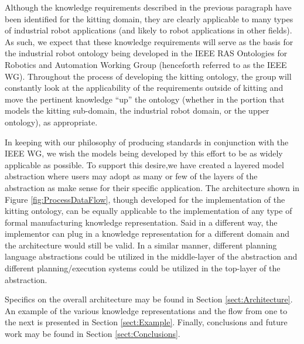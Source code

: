 \documentclass[a4paper, 10pt, conference]{ieeeconf}      %
\begin{document}
Although the knowledge requirements described in the previous paragraph have been identified for the kitting domain, they are clearly applicable to many types of industrial robot applications (and likely to robot applications in other fields). As such, we expect that these knowledge requirements will serve as the basis for the industrial robot ontology being developed in the IEEE  RAS Ontologies for Robotics and Automation Working Group \cite{Madhavan2011} (henceforth referred to as the IEEE WG). Throughout the process of developing the kitting ontology, the group will constantly look at the applicability of the requirements outside of kitting and move the pertinent knowledge ``up'' the ontology (whether in the portion that models the kitting sub-domain, the industrial robot domain, or the upper ontology), as appropriate.

In keeping with our philosophy of producing standards in conjunction with the IEEE WG, we wish the models being developed by this effort to be as widely applicable as possible. To support this desire,we have
created a layered model abstraction where users may adopt as many or few of the layers of the abstraction as make sense for their
specific application.  The architecture shown in Figure \ref{fig:ProcessDataFlow}, though developed for the implementation of the kitting ontology, can be equally applicable to the implementation of any type of formal manufacturing knowledge representation. Said in a different way, the implementor can plug in a knowledge representation for a different domain and the architecture would still be valid. In a similar manner, different planning language abstractions could be utilized in the middle-layer of the
abstraction and different planning/execution systems could be utilized in the top-layer of the abstraction.

Specifics on the overall architecture may be found in Section \ref{sect:Architecture}. An example of the
various knowledge representations and the flow from one to the next is presented in Section \ref{sect:Example}. Finally,
conclusions and future work may be found in Section \ref{sect:Conclusions}.
\end{document}
